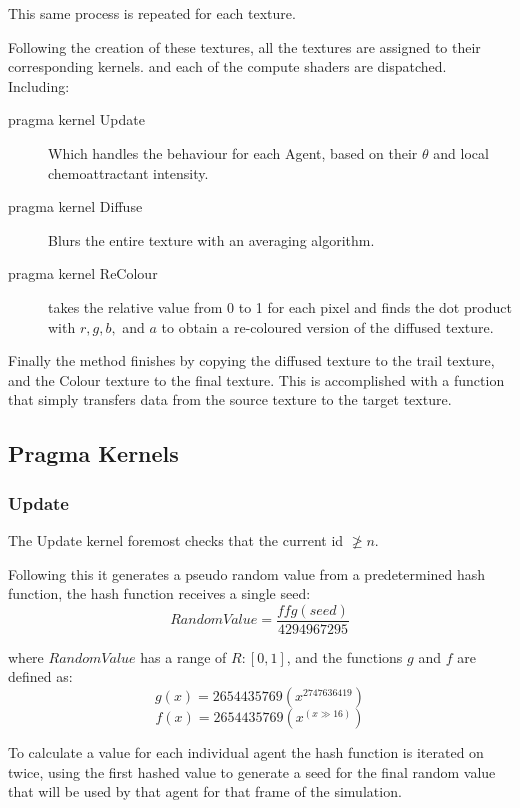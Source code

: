 \documentclass[]{report}
\begin{document}
This same process is repeated for each texture.

Following the creation of these textures, all the textures are assigned to their corresponding kernels. and each of the compute shaders are dispatched. Including:
\begin{description}
    \item[pragma kernel Update] Which handles the behaviour for each Agent, based on their $\theta$ and local \gls{chemoattractant} intensity.
    \item[pragma kernel Diffuse] Blurs the entire texture with an averaging algorithm.
    \item[pragma kernel ReColour] takes the relative value from 0 to 1 for each pixel and finds the dot product with $r, g, b,$ and $a$ to obtain a re-coloured version of the diffused texture.
\end{description}

Finally the method finishes by copying the diffused texture to the trail texture, and the Colour texture to the final texture. This is accomplished with a function that simply transfers data from the source texture to the target texture. 

\subsection{Pragma Kernels}
\subsubsection{Update}

The Update kernel foremost checks that the current id $\not\geq n$.

Following this it generates a pseudo random value from a predetermined hash function, the hash function receives a single seed:
\begin{equation}
    RandomValue = \frac{ffg(seed)}{4294967295}
\end{equation}

where $RandomValue$ has a range of $R:[0,1]$, and the functions $g$ and $f$ are defined as: 
\begin{equation}
    g(x) = 2654435769\left(x ^{2747636419}\right)
\end{equation}
\begin{equation}
    f(x) = 2654435769\left(x^{(x \gg 16)}\right)
\end{equation}

To calculate a value for each individual agent the hash function is iterated on twice, using the first hashed value to generate a seed for the final random value that will be used by that agent for that frame of the simulation.
\end{document}
